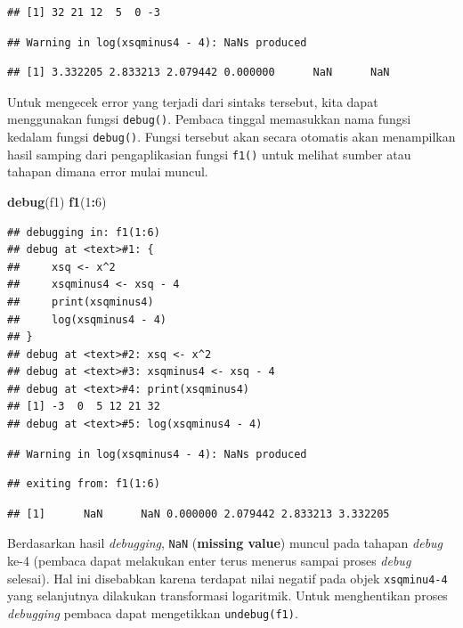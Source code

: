 \documentclass[]{book}
\newenvironment{Shaded}{\begin{snugshade}}{\end{snugshade}}
\newcommand{\DecValTok}[1]{\textcolor[rgb]{0.00,0.00,0.81}{#1}}
\newcommand{\KeywordTok}[1]{\textcolor[rgb]{0.13,0.29,0.53}{\textbf{#1}}}
\newcommand{\NormalTok}[1]{#1}
\newcommand{\OperatorTok}[1]{\textcolor[rgb]{0.81,0.36,0.00}{\textbf{#1}}}
\theoremstyle{definition}
\theoremstyle{definition}
\theoremstyle{definition}
\theoremstyle{remark}
\begin{document}
\begin{verbatim}
## [1] 32 21 12  5  0 -3
\end{verbatim}

\begin{verbatim}
## Warning in log(xsqminus4 - 4): NaNs produced
\end{verbatim}

\begin{verbatim}
## [1] 3.332205 2.833213 2.079442 0.000000      NaN      NaN
\end{verbatim}

Untuk mengecek error yang terjadi dari sintaks tersebut, kita dapat menggunakan fungsi \texttt{debug()}. Pembaca tinggal memasukkan nama fungsi kedalam fungsi \texttt{debug()}. Fungsi tersebut akan secara otomatis akan menampilkan hasil samping dari pengaplikasian fungsi \texttt{f1()} untuk melihat sumber atau tahapan dimana error mulai muncul.

\begin{Shaded}
\begin{Highlighting}[]
\KeywordTok{debug}\NormalTok{(f1)}
\KeywordTok{f1}\NormalTok{(}\DecValTok{1}\OperatorTok{:}\DecValTok{6}\NormalTok{)}
\end{Highlighting}
\end{Shaded}

\begin{verbatim}
## debugging in: f1(1:6)
## debug at <text>#1: {
##     xsq <- x^2
##     xsqminus4 <- xsq - 4
##     print(xsqminus4)
##     log(xsqminus4 - 4)
## }
## debug at <text>#2: xsq <- x^2
## debug at <text>#3: xsqminus4 <- xsq - 4
## debug at <text>#4: print(xsqminus4)
## [1] -3  0  5 12 21 32
## debug at <text>#5: log(xsqminus4 - 4)
\end{verbatim}

\begin{verbatim}
## Warning in log(xsqminus4 - 4): NaNs produced
\end{verbatim}

\begin{verbatim}
## exiting from: f1(1:6)
\end{verbatim}

\begin{verbatim}
## [1]      NaN      NaN 0.000000 2.079442 2.833213 3.332205
\end{verbatim}

Berdasarkan hasil \emph{debugging}, \texttt{NaN} (\textbf{missing value}) muncul pada tahapan \emph{debug} ke-4 (pembaca dapat melakukan enter terus menerus sampai proses \emph{debug} selesai). Hal ini disebabkan karena terdapat nilai negatif pada objek \texttt{xsqminu4-4} yang selanjutnya dilakukan transformasi logaritmik. Untuk menghentikan proses \emph{debugging} pembaca dapat mengetikkan \texttt{undebug(f1)}.
\end{document}
